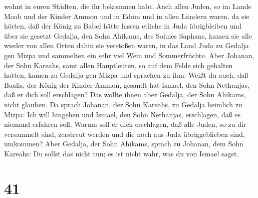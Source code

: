 wohnt in euren Städten, die ihr bekommen habt.  Auch allen
Juden, so im Lande Moab und der Kinder Ammon und in Edom und in allen
Ländern waren, da sie hörten, daß der König zu Babel hätte lassen
etliche in Juda übrigbleiben und über sie gesetzt Gedalja, den Sohn
Ahikams, des Sohnes Saphans,  kamen sie alle wieder von
allen Orten dahin sie verstoßen waren, in das Land Juda zu Gedalja gen
Mizpa und sammelten ein sehr viel Wein und Sommerfrüchte. 
Aber Johanan, der Sohn Kareahs, samt allen Hauptleuten, so auf dem Felde
sich gehalten hatten, kamen zu Gedalja gen Mizpa  und
sprachen zu ihm: Weißt du auch, daß Baalis, der König der Kinder Ammon,
gesandt hat Ismael, den Sohn Nethanjas, daß er dich soll erschlagen? Das
wollte ihnen aber Gedalja, der Sohn Ahikams, nicht glauben.
 Da sprach Johanan, der Sohn Kareahs, zu Gedalja heimlich
zu Mizpa: Ich will hingehen und Ismael, den Sohn Nethanjas, erschlagen,
daß es niemand erfahren soll. Warum soll er dich erschlagen, daß alle
Juden, so zu dir versammelt sind, zerstreut werden und die noch aus Juda
übriggeblieben sind, umkommen?  Aber Gedalja, der Sohn
Ahikams, sprach zu Johanan, dem Sohn Kareahs: Du sollst das nicht tun;
es ist nicht wahr, was du von Ismael sagst.

\hypertarget{section-40}{%
\section{41}\label{section-40}}

